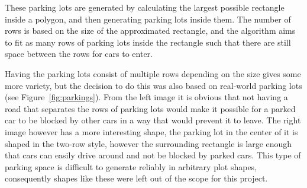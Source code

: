 These parking lots are generated by calculating the largest possible rectangle inside a polygon, and then generating parking lots inside them.
The number of rows is based on the size of the approximated rectangle, and the algorithm aims to fit as many rows of parking lots inside the rectangle such that there are still space between the rows for cars to enter.

Having the parking lots consist of multiple rows depending on the size gives some more variety, but the decision to do this was also based on real-world parking lots (see Figure~\ref{fig:parkings}).
From the left image it is obvious that not having a road that separates the rows of parking lots would make it possible for a parked car to be blocked by other cars in a way that would prevent it to leave.
The right image however has a more interesting shape, the parking lot in the center of it is shaped in the two-row style, however the surrounding rectangle is large enough that cars can easily drive around and not be blocked by parked cars.
This type of parking space is difficult to generate reliably in arbitrary plot shapes, consequently shapes like these were left out of the scope for this project.
